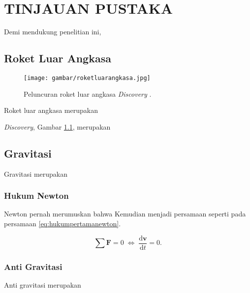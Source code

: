 \chapter{TINJAUAN PUSTAKA}
\label{chap:tinjauanpustaka}


Demi mendukung penelitian ini, \lipsum[1][1-5]

\section{Roket Luar Angkasa}
\label{sec:roketluarangkasa}

\begin{figure}[ht]
  \centering

  \texttt{[image: gambar/roketluarangkasa.jpg]}

  \caption{Peluncuran roket luar angkasa \emph{Discovery} \citep{roketluarangkasa}.}
  \label{fig:roketluarangkasa}
\end{figure}

Roket luar angkasa merupakan \lipsum[1]

\emph{Discovery}, Gambar \ref{fig:roketluarangkasa}, merupakan \lipsum[2]

\section{Gravitasi}
\label{sec:gravitasi}

Gravitasi merupakan \lipsum[1]

\subsection{Hukum Newton}
\label{subsec:hukumnewton}

Newton \citep{newton1687} pernah merumuskan bahwa \lipsum[1]
Kemudian menjadi persamaan seperti pada persamaan \ref{eq:hukumpertamanewton}.

\begin{equation}
  \label{eq:hukumpertamanewton}
  \sum \mathbf{F} = 0\; \Leftrightarrow\; \frac{\mathrm{d} \mathbf{v} }{\mathrm{d}t} = 0.
\end{equation}

\subsection{Anti Gravitasi}
\label{subsec:antigravitasi}

Anti gravitasi merupakan \lipsum[1]
